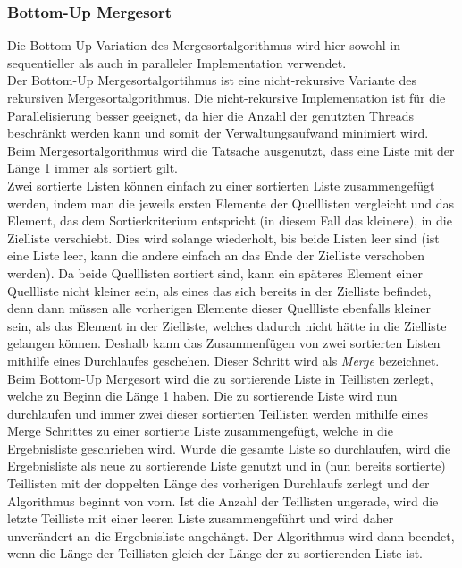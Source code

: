 \subsubsection{Bottom-Up Mergesort}\label{mergesort}
Die Bottom-Up Variation des Mergesortalgorithmus wird hier sowohl in sequentieller als auch in paralleler Implementation verwendet.\\
Der Bottom-Up Mergesortalgortihmus ist eine nicht-rekursive Variante des rekursiven Mergesortalgorithmus. Die nicht-rekursive Implementation ist für die Parallelisierung besser geeignet, da hier die Anzahl der genutzten Threads beschränkt werden kann und somit der Verwaltungsaufwand minimiert wird.\\
Beim Mergesortalgorithmus wird die Tatsache ausgenutzt, dass eine Liste mit der Länge 1 immer als sortiert gilt.\\
Zwei sortierte Listen können einfach zu einer sortierten Liste zusammengefügt werden, indem man die jeweils ersten Elemente der Quelllisten vergleicht und das Element, das dem Sortierkriterium entspricht (in diesem Fall das kleinere), in die Zielliste verschiebt. Dies wird solange wiederholt, bis beide Listen leer sind (ist eine Liste leer, kann die andere einfach an das Ende der Zielliste verschoben werden). Da beide Quelllisten sortiert sind, kann ein späteres Element einer Quellliste nicht kleiner sein, als eines das sich bereits in der Zielliste befindet, denn dann müssen alle vorherigen Elemente dieser Quellliste ebenfalls kleiner sein, als das Element in der Zielliste, welches dadurch nicht hätte in die Zielliste gelangen können. Deshalb kann das Zusammenfügen von zwei sortierten Listen mithilfe eines Durchlaufes geschehen. Dieser Schritt wird als \textit{\glqq Merge\grqq} bezeichnet.\\
Beim Bottom-Up Mergesort wird die zu sortierende Liste in Teillisten zerlegt, welche zu Beginn die Länge 1 haben. Die zu sortierende Liste wird nun durchlaufen und immer zwei dieser sortierten Teillisten werden mithilfe eines Merge Schrittes zu einer sortierte Liste zusammengefügt, welche in die Ergebnisliste geschrieben wird. Wurde die gesamte Liste so durchlaufen, wird die Ergebnisliste als neue zu sortierende Liste genutzt und in (nun bereits sortierte) Teillisten mit der doppelten Länge des vorherigen Durchlaufs zerlegt und der Algorithmus beginnt von vorn. Ist die Anzahl der Teillisten ungerade, wird die letzte Teilliste mit einer leeren Liste zusammengeführt und wird daher unverändert an die Ergebnisliste angehängt. Der Algorithmus wird dann beendet, wenn die Länge der Teillisten gleich der Länge der zu sortierenden Liste ist. \cite{Wayne_Merge_Sort}\\

